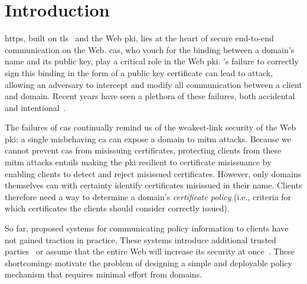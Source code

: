 \section{Introduction}
\label{sec:intro}


\acs{https}, built on \ac{tls}~\cite{rfc5246} and the Web \ac{pki}, lies at the
heart of secure end-to-end communication on the Web. \Acp{ca}, who vouch for the
binding between a domain's name and its public key, play a critical role in the
Web \ac{pki}. 's failure to correctly sign this binding in the form of a
public key certificate can lead to  attack, allowing an adversary to
intercept and modify all communication between a client and domain. Recent years
have seen a plethora of these failures, both
accidental~\cite{sleevi2015sustaining} and
intentional~\cite{valsorda2015komodia}.

The failures of \acp{ca} continually remind us of the weakest-link security of
the Web \ac{pki}: a single misbehaving \ac{ca} can expose a domain to \ac{mitm}
attacks. Because we cannot prevent \acp{ca} from misissuing certificates,
protecting clients from these \ac{mitm} attacks entails making the \ac{pki}
resilient to certificate misissuance by enabling clients to detect and reject
misissued certificates. However, only domains themselves can with certainty
identify certificates misissued in their name. Clients therefore need a way to
determine a domain's \emph{certificate policy} (i.e., criteria for which
certificates the clients should consider correctly issued).

So far, proposed systems for communicating policy information to clients have
not gained traction in practice. These systems introduce additional trusted
parties~\cite{kim2013accountable} or assume that the entire Web will increase
its security at once~\cite{basin2014arpki}. These shortcomings motivate the
problem of designing a simple and deployable policy mechanism that requires
minimal effort from domains. 

